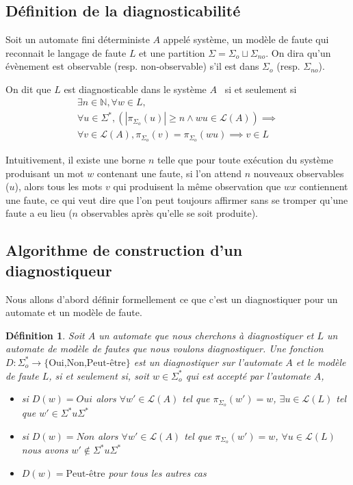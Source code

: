 \documentclass[10pt,a4paper]{article}
\newtheorem{mydef}{D\'efinition}
\begin{document}
\subsection{Définition de la diagnosticabilité}
    
Soit un automate fini d\'eterministe $A$ appel\'e syst\`eme, un modèle de faute qui reconnait le langage de faute $L$ et une partition $\Sigma=\Sigma_o\sqcup \Sigma_{no}$. On dira qu'un \'ev\`enement est observable (resp. non-observable) s'il est dans $\Sigma_o$ (resp. $\Sigma_{no}$).

On dit que $L$ est diagnosticable dans le système $A$~\cite{SamSRST96}  si et seulement si $$\begin{array}{l}
\exists n \in \mathbb N, \forall w \in L,\\
\forall u \in \Sigma^*, \left(\left|\pi_{\Sigma_o}(u)\right|\ge n \land wu \in \mathcal L(A)\right) \implies\\
\forall v \in \mathcal L(A), \pi_{\Sigma_o}(v)=\pi_{\Sigma_o}(wu) \implies v \in L
\end{array}$$

Intuitivement, il existe une borne $n$ telle que pour toute ex\'ecution du système produisant un mot $w$ contenant une faute, si l'on attend $n$ nouveaux observables ($u$), alors tous les mots $v$ qui produisent la m\^eme observation que $wx$ contiennent une faute, ce qui veut dire que l'on peut toujours affirmer sans se tromper qu'une faute a eu lieu ($n$ observables après qu'elle se soit produite).

\subsection{Algorithme de construction d'un diagnostiqueur}

Nous allons d'abord d\'efinir formellement ce que c'est un diagnostiquer pour un automate et un mod\`ele de faute.
\begin{mydef}
  Soit $A$ un automate que nous cherchons \`a diagnostiquer et $L$ un automate de mod\`ele de fautes que nous voulons diagnostiquer. Une fonction $D : \Sigma_o^* \to \{\mbox{Oui,Non,Peut-\^etre}\}$ est un diagnostiquer sur l'automate $A$ et le mod\`ele de faute $L$, si et seulement si, soit $w \in \Sigma_o^*$ qui est accept\'e par l'automate $A$,
  \begin{itemize}
  \item si $D(w) = Oui$ alors $\forall w' \in \mathcal{L}(A)$ tel que $\pi_{\Sigma_o}(w') = w$, $\exists u \in \mathcal{L}(L)$ tel que $w' \in \Sigma^* u \Sigma^*$
  \item si $D(w) = Non$ alors $\forall w' \in \mathcal{L}(A)$ tel que $\pi_{\Sigma_o}(w') = w$, $\forall u \in \mathcal{L}(L)$ nous avons $w' \not \in \Sigma^* u \Sigma^*$
  \item $D(w) = \mbox{Peut-\^etre}$ pour tous les autres cas
  \end{itemize}
  
\end{mydef}
\end{document}
